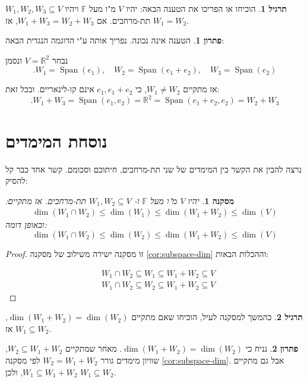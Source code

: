 \documentclass[12pt]{report}
\theoremstyle{plain}
\newtheorem{corollary}[theorem]{מסקנה}
\theoremstyle{definition}
\newtheorem{exercise}{תרגיל}[chapter]
\newtheorem*{solution}{פתרון}
\newcommand{\R}{\mathbb{R}}
\newcommand{\F}{\mathbb{F}}
\newcommand{\0}{\mathbf{0}}
\DeclareMathOperator{\Span}{Span}
\begin{document}
\begin{exercise}
הוכיחו או הפריכו את הטענה הבאה: יהיו
$V$
מ"ו מעל
$\F$
ויהיו 
$W_1,W_2,W_3\subseteq V$
תת-מרחבים.
אם
$W_1+W_3=W_2+W_3$,
אז 
$W_1=W_2$.
\end{exercise}

\begin{solution}
הטענה אינה נכונה. נפריך אותה ע"י הדוגמה הנגדית הבאה: 

נבחר
$V=\R^2$ 
ונסמן
$$
.W_1=\Span(e_1),\quad W_2=\Span(e_1+e_2),\quad W_3=\Span(e_2)
$$

אז מתקיים
$W_1\neq W_2$,
כי
$e_1,e_1+e_2$
אינם קו-לינאריים. ובכל זאת:
$$
.W_1+W_3=\Span(e_1,e_2)=\R^2=\Span(e_1+e_2,e_2)=W_2+W_3
$$
    
\end{solution}

\section{נוסחת המימדים}

נרצה להבין את הקשר בין המימדים של שני תת-מרחבים, חיתוכם וסכומם. קשר אחד כבר קל להסיק:

\begin{corollary}
יהיו
$V$
מ"ו מעל
$\F$
ו-
$W_1,W_2\subseteq V$
תת-מרחבים.
אז מתקיים:
$$
\begin{aligned}
\dim(W_1\cap W_2)\leq \dim(W_1)\leq\dim(W_1+W_2)\leq\dim(V)
\end{aligned}
$$
ובאופן דומה:
$$
\dim(W_1\cap W_2)\leq \dim(W_2)\leq\dim(W_1+W_2)\leq\dim(V)
$$
\end{corollary}

\begin{proof}
זו מסקנה ישירה משילוב של מסקנה
\ref{cor:subspace-dim}
וההכלות הבאות:

$$
\begin{aligned}
&W_1\cap W_2\subseteq W_1\subseteq W_1+W_2\subseteq V \\
&W_1\cap W_2\subseteq W_2\subseteq W_1+W_2\subseteq V 
\end{aligned}
$$

\end{proof}

\begin{exercise}
כהמשך למסקנה לעיל, הוכיחו שאם מתקיים
$\dim(W_1+W_2)=\dim(W_2)$,
אז
$W_1\subseteq W_2$.
\end{exercise}

\begin{solution}
נניח כי $\dim(W_1+W_2)=\dim(W_2)$.
מאחר שמתקיים
$W_2\subseteq W_1+W_2$,
שוויון מימדים גורר 
$W_2=W_1+W_2$
לפי מסקנה
\ref{cor:subspace-dim}.
אבל גם מתקיים
$W_1\subseteq W_1+W_2$,
ולכן
$W_1\subseteq W_2$.
\end{solution}
\end{document}
